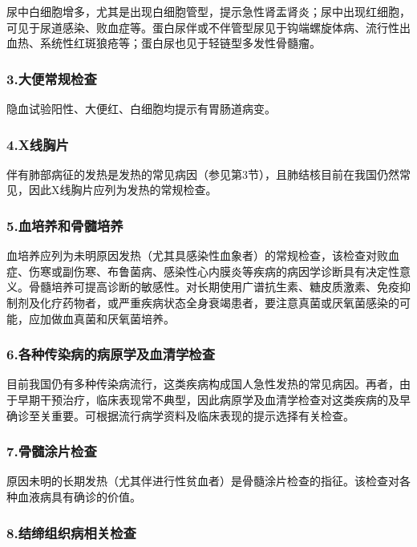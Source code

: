 尿中白细胞增多，尤其是出现白细胞管型，提示急性肾盂肾炎；尿中出现红细胞，可见于尿道感染、败血症等。蛋白尿伴或不伴管型尿见于钩端螺旋体病、流行性出血热、系统性红斑狼疮等；蛋白尿也见于轻链型多发性骨髓瘤。

\subsubsection{3.大便常规检查}

隐血试验阳性、大便红、白细胞均提示有胃肠道病变。

\subsubsection{4.X线胸片}

伴有肺部病征的发热是发热的常见病因（参见第3节），且肺结核目前在我国仍然常见，因此X线胸片应列为发热的常规检查。

\subsubsection{5.血培养和骨髓培养}

血培养应列为未明原因发热（尤其具感染性血象者）的常规检查，该检查对败血症、伤寒或副伤寒、布鲁菌病、感染性心内膜炎等疾病的病因学诊断具有决定性意义。骨髓培养可提高诊断的敏感性。对长期使用广谱抗生素、糖皮质激素、免疫抑制剂及化疗药物者，或严重疾病状态全身衰竭患者，要注意真菌或厌氧菌感染的可能，应加做血真菌和厌氧菌培养。

\subsubsection{6.各种传染病的病原学及血清学检查}

目前我国仍有多种传染病流行，这类疾病构成国人急性发热的常见病因。再者，由于早期干预治疗，临床表现常不典型，因此病原学及血清学检查对这类疾病的及早确诊至关重要。可根据流行病学资料及临床表现的提示选择有关检查。

\subsubsection{7.骨髓涂片检查}

原因未明的长期发热（尤其伴进行性贫血者）是骨髓涂片检查的指征。该检查对各种血液病具有确诊的价值。

\subsubsection{8.结缔组织病相关检查}

